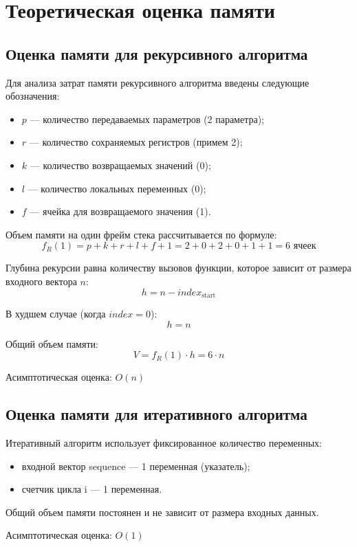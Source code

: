 \section{Теоретическая оценка памяти}
\subsection{Оценка памяти для рекурсивного алгоритма}
Для анализа затрат памяти рекурсивного алгоритма введены следующие обозначения:

\begin{itemize}
	\item $p$ — количество передаваемых параметров (2 параметра);
	\item $r$ — количество сохраняемых регистров (примем 2);
	\item $k$ — количество возвращаемых значений (0);
	\item $l$ — количество локальных переменных (0);
	\item $f$ — ячейка для возвращаемого значения (1).
\end{itemize}

Объем памяти на один фрейм стека рассчитывается по формуле:
\[
f_R(1) = p + k + r + l + f + 1 = 2 + 0 + 2 + 0 + 1 + 1 = 6 \text{ ячеек}
\]

Глубина рекурсии равна количеству вызовов функции, которое зависит от размера входного вектора $n$:
\[
h = n - index_{\text{start}}
\]

В худшем случае (когда $index = 0$):
\[
h = n
\]

Общий объем памяти:
\[
V = f_R(1) \cdot h = 6 \cdot n
\]

Асимптотическая оценка: $O(n)$

\subsection{Оценка памяти для итеративного алгоритма}
Итеративный алгоритм использует фиксированное количество переменных:

\begin{itemize}
	\item входной вектор sequence — 1 переменная (указатель);
	\item счетчик цикла i — 1 переменная.
\end{itemize}

Общий объем памяти постоянен и не зависит от размера входных данных.

Асимптотическая оценка: $O(1)$


